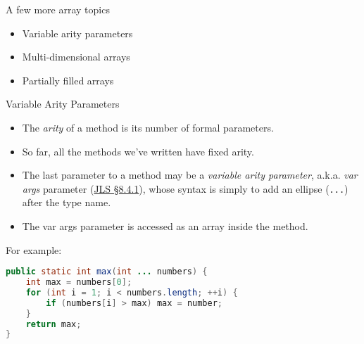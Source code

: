\documentclass{beamer}
\begin{document}
\begin{frame}
  \titlepage
\end{frame}

\begin{frame}[fragile]{A few more array topics}


\begin{itemize}
\item Variable arity parameters
\item Multi-dimensional arrays
\item Partially filled arrays
\end{itemize}


\end{frame}

\begin{frame}[fragile]{Variable Arity Parameters}


\begin{itemize}
\item The {\it arity} of a method is its number of formal parameters.
\item So far, all the methods we've written have fixed arity.
\item The last parameter to a method may be a {\it variable arity parameter}, a.k.a. {\it var args} parameter (\href{http://docs.oracle.com/javase/specs/jls/se7/html/jls-8.html#jls-8.4.1}{JLS \S 8.4.1}), whose syntax is simply to add an ellipse ({\tt ...}) after the type name.
\item The var args parameter is accessed as an array inside the method.
\end{itemize}
For example:
\begin{lstlisting}[language=Java]
public static int max(int ... numbers) {
    int max = numbers[0];
    for (int i = 1; i < numbers.length; ++i) {
        if (numbers[i] > max) max = number;
    }
    return max;
}
\end{lstlisting}

\end{frame}
\end{document}
